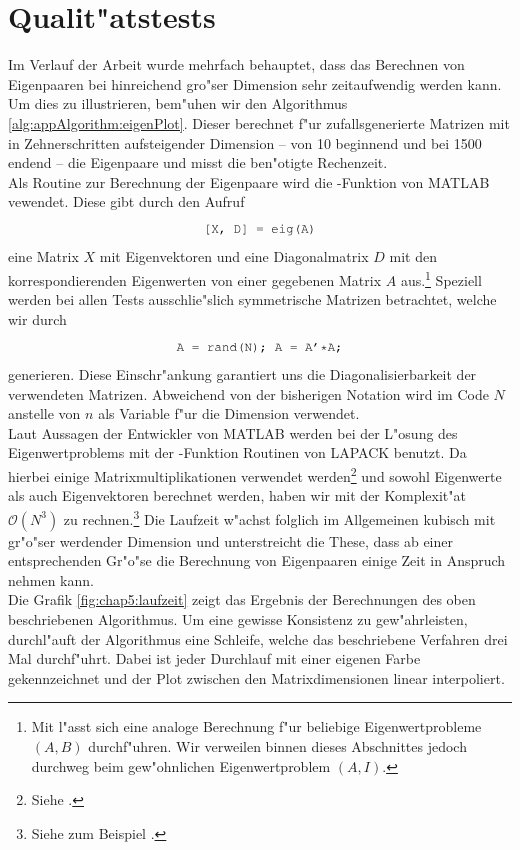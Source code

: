 \newpage
\section{Qualit"atstests}
Im Verlauf der Arbeit wurde mehrfach behauptet, dass das Berechnen von Eigenpaaren bei hinreichend gro"ser Dimension sehr zeitaufwendig werden kann. Um dies zu illustrieren, bem"uhen wir den Algorithmus \ref{alg:appAlgorithm:eigenPlot}. Dieser berechnet f"ur zufallsgenerierte Matrizen mit in Zehnerschritten aufsteigender Dimension -- von 10 beginnend und bei 1500 endend -- die Eigenpaare und misst die ben"otigte Rechenzeit.\\

Als Routine zur Berechnung der Eigenpaare wird die -Funktion von MATLAB vewendet. Diese gibt durch den Aufruf
\[
\mcode{[X, D] = eig(A)}
\]
eine Matrix $X$ mit Eigenvektoren und eine Diagonalmatrix $D$ mit den korrespondierenden Eigenwerten von einer gegebenen Matrix $A$ aus.\footnote{Mit  l"asst sich eine analoge Berechnung f"ur beliebige Eigenwertprobleme $(A,B)$ durchf"uhren. Wir verweilen binnen dieses Abschnittes jedoch durchweg beim gew"ohnlichen Eigenwertproblem $(A,I)$.} Speziell werden bei allen Tests ausschlie"slich symmetrische Matrizen betrachtet, welche wir durch
\[
\mcode{A = rand(N); A = A'*A;}
\]
generieren. Diese Einschr"ankung garantiert uns die Diagonalisierbarkeit der verwendeten Matrizen. Abweichend von der bisherigen Notation wird im Code $N$ anstelle von $n$ als Variable f"ur die Dimension verwendet.\\

Laut Aussagen der Entwickler von MATLAB werden bei der L"osung des Eigenwertproblems mit der -Funktion Routinen von LAPACK benutzt. Da hierbei einige Matrixmultiplikationen verwendet werden\footnote{Siehe \cite{lapack}.} und sowohl Eigenwerte als auch Eigenvektoren berechnet werden, haben wir mit der Komplexit"at $\mathcal{O}(N^3)$ zu rechnen.\footnote{Siehe zum Beispiel \cite[Abschnitt 6]{Demmel2007}.} Die Laufzeit w"achst folglich im Allgemeinen kubisch mit gr"o"ser werdender Dimension und unterstreicht die These, dass ab einer entsprechenden Gr"o"se die Berechnung von Eigenpaaren einige Zeit in Anspruch nehmen kann.\\

Die Grafik \ref{fig:chap5:laufzeit} zeigt das Ergebnis der Berechnungen des oben beschriebenen Algorithmus.
Um eine gewisse Konsistenz zu gew"ahrleisten, durchl"auft der Algorithmus eine Schleife, welche das beschriebene Verfahren drei Mal durchf"uhrt. Dabei ist jeder Durchlauf mit einer eigenen Farbe gekennzeichnet und der Plot zwischen den Matrixdimensionen linear interpoliert.\\

